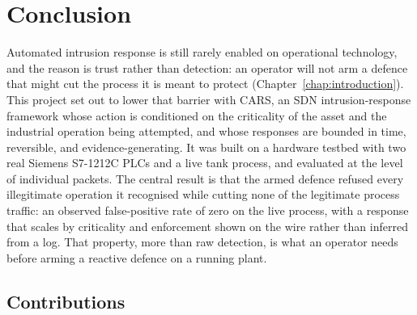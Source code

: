 \chapter{Conclusion}
\label{chap:conclusion}

\noindent
Automated intrusion response is still rarely enabled on operational technology, and the reason is trust rather than detection: an operator will not arm a defence that might cut the process it is meant to protect (Chapter~\ref{chap:introduction}). This project set out to lower that barrier with CARS, an SDN intrusion-response framework whose action is conditioned on the criticality of the asset and the industrial operation being attempted, and whose responses are bounded in time, reversible, and evidence-generating. It was built on a hardware testbed with two real Siemens S7-1212C PLCs and a live tank process, and evaluated at the level of individual packets. The central result is that the armed defence refused every illegitimate operation it recognised while cutting none of the legitimate process traffic: an observed false-positive rate of zero on the live process, with a response that scales by criticality and enforcement shown on the wire rather than inferred from a log. That property, more than raw detection, is what an operator needs before arming a reactive defence on a running plant.

\section{Contributions}
\label{sec:contributions}


